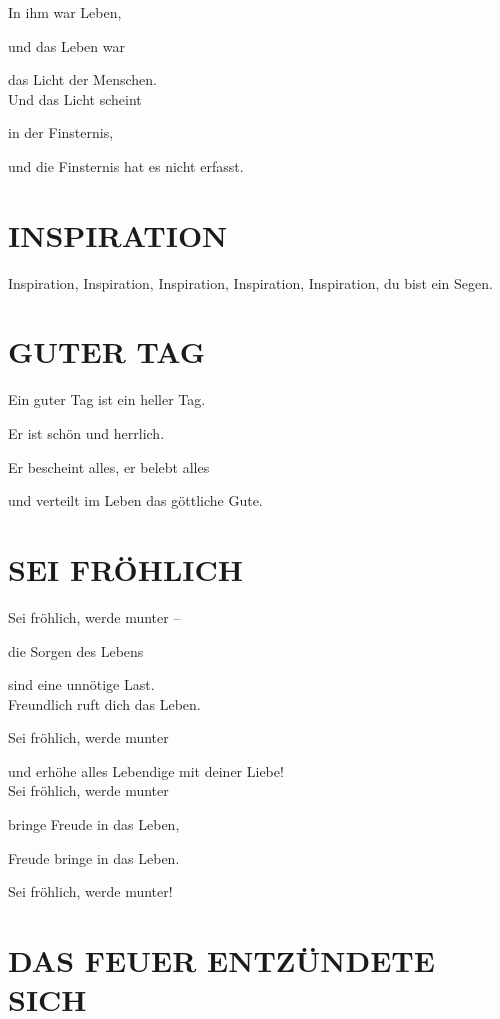 \documentclass[11pt,a5paper,twoside]{article}
\begin{document}
In ihm war Leben, 

und das Leben war 

das Licht der Menschen.\\


Und das Licht scheint

in der Finsternis, 

und die Finsternis hat es nicht erfasst.\\



\section[Inspiration]{INSPIRATION}

Inspiration, Inspiration, Inspiration, Inspiration, Inspiration, du bist ein Segen.

\section[Guter Tag]{GUTER TAG}

Ein guter Tag ist ein heller Tag. 

Er ist schön und herrlich. 

Er bescheint alles, er belebt alles

und verteilt im Leben das göttliche Gute. 

\section[Sei fröhlich]{SEI FRÖHLICH}

Sei fröhlich, werde munter --

die Sorgen des Lebens

sind eine unnötige Last.\\

Freundlich ruft dich das Leben. 

Sei fröhlich, werde munter

und erhöhe alles Lebendige mit deiner Liebe!\\

Sei fröhlich, werde munter

bringe Freude in das Leben,

Freude bringe in das Leben. 

Sei fröhlich, werde munter! 

\section[Das Feuer entzündete sich]{DAS FEUER ENTZÜNDETE SICH}
\end{document}
